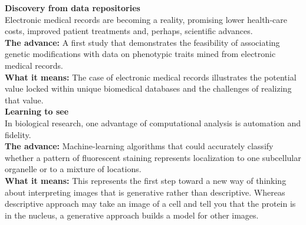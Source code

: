 \documentclass[10pt,a4paper]{report}
\begin{document}
	\textbf{Discovery from data repositories}\\
	Electronic medical records are becoming a reality, promising lower health-care costs, improved patient treatments and, perhaps, scientific advances.\\
	\textbf{The advance:} A first study that demonstrates the feasibility of associating genetic modifications with data on phenotypic traits mined from electronic medical records.\\
	\textbf{What it means:} The case of electronic medical records illustrates the potential value locked within unique biomedical databases and the challenges of realizing that value.\\
	
	\textbf{Learning to see}\\
	In biological research, one advantage of computational analysis is automation and fidelity.\\
	\textbf{The advance:} Machine-learning algorithms that could accurately classify whether a pattern of fluorescent staining represents localization to one subcellular organelle or to a mixture of locations.\\
	\textbf{What it means:} This represents the first step toward a new way of thinking about interpreting images that is generative rather than descriptive.
	Whereas descriptive approach may take an image of a cell and tell you that the protein is in the nucleus, a generative approach builds a model for other images.
	
	\newpage
\end{document}
